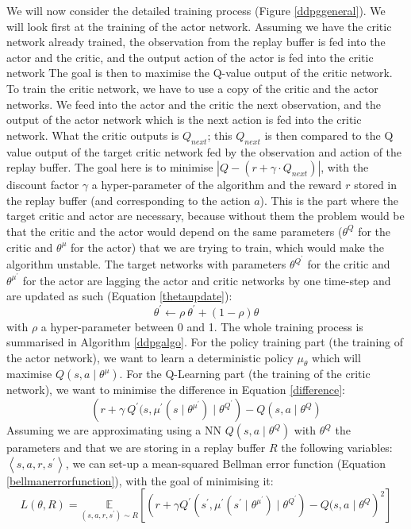 We will now consider the detailed training process (Figure \ref{ddpggeneral}). We will look first at the training of the actor network. Assuming we have the critic network already trained, the observation from the replay buffer is fed into the actor and the critic, and the output action of the actor is fed into the critic network The goal is then to maximise the Q-value output of the critic network. \newline
To train the critic network, we have to use a copy of the critic and the actor networks. We feed into the actor and the critic the next observation, and the output of the actor network which is the next action is fed into the critic network. What the critic outputs is $Q_{next}$; this $Q_{next}$ is then compared to the Q value output of the target critic network fed by the observation and action of the replay buffer. The goal here is to minimise $ | Q - (r + \gamma \cdot Q_{next})|$, with the discount factor $ \gamma $ a hyper-parameter of the algorithm and the reward $r$ stored in the replay buffer (and corresponding to the action $a$). This is the part where the target critic and actor are necessary, because without them the problem would be that the critic and the actor would depend on the same parameters ($\theta^{Q}$ for the critic and $\theta^{\mu}$ for the actor) that we are trying to train, which would make the algorithm unstable. The target networks with parameters $\theta^{Q^{'}}$ for the critic and $\theta^{\mu^{'}}$ for the actor are lagging the actor and critic networks by one time-step and are updated as such (Equation \ref{thetaupdate}):
\begin{equation}
\label{thetaupdate}
	 \theta^{'} \leftarrow \rho \: \theta^{'} + (1- \rho)\theta
\end{equation}
with $\rho$ a hyper-parameter between 0 and 1. The whole training process is summarised in Algorithm \ref{ddpgalgo}. \newline
For the policy training part (the training of the actor network), we want to learn a deterministic policy $\mu_{\theta}$ which will maximise $Q(s,a\mid \theta^{\mu})$. For the Q-Learning part (the training of the critic network), we want to minimise the difference in Equation \ref{difference}:
\begin{equation}
\label{difference}
 \left(r + \gamma \: Q^{'}(s,\mu^{'}\left(s \mid \theta^{\mu^{'}}\right) \mid \theta^{Q^{'}}\right) - Q\left(s,a \mid \theta^{Q}\right)
\end{equation}
  Assuming we are approximating using a NN $ Q(s,a\mid \theta^{Q}) $ with $ \theta^{Q} $ the parameters and that we are storing in a replay buffer $R$ the following variables: $ \left< s,a,r,s^{'} \right>$, we can set-up a mean-squared Bellman error function (Equation \ref{bellmanerrorfunction}), with the goal of minimising it:
  \begin{equation}
  \label{bellmanerrorfunction}
  L(\theta,R) = \underset{(s,a,r,s^{'}) \sim R}{\mathbb{E}} \left[\left(r + \gamma Q^{'}\left(s^{'},\mu^{'}\left(s^{'}\mid \theta^{\mu^{'}}\right) \mid \theta^{Q^{'}} \right) - Q(s,a \mid \theta^{Q} \right)^{2}\right]  	
  \end{equation}

